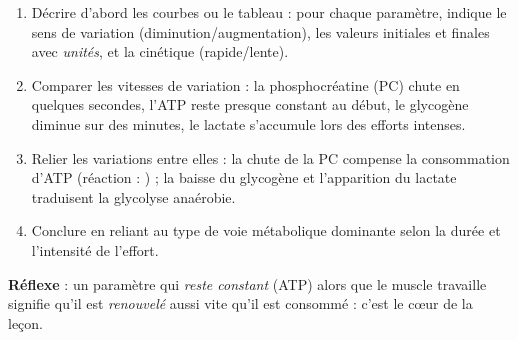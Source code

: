 \documentclass[11pt]{article}
\newcommand{\cle}[1]{{\popxbold\color{popdark}#1}}
\begin{document}
\begin{methode}
\begin{enumerate}
\item \cle{Décrire d'abord les courbes ou le tableau} : pour chaque paramètre, indique le sens de variation (diminution/augmentation), les valeurs initiales et finales avec \emph{unités}, et la cinétique (rapide/lente).
\item \cle{Comparer} les vitesses de variation : la phosphocréatine (PC) chute en quelques secondes, l'ATP reste presque constant au début, le glycogène diminue sur des minutes, le lactate s'accumule lors des efforts intenses.
\item \cle{Relier les variations entre elles} : la chute de la PC compense la consommation d'ATP (réaction : ) ; la baisse du glycogène et l'apparition du lactate traduisent la glycolyse anaérobie.
\item \cle{Conclure} en reliant au type de voie métabolique dominante selon la durée et l'intensité de l'effort.
\end{enumerate}
\textbf{Réflexe} : un paramètre qui \emph{reste constant} (ATP) alors que le muscle travaille signifie qu'il est \emph{renouvelé} aussi vite qu'il est consommé : c'est le cœur de la leçon.
\end{methode}
\end{document}
